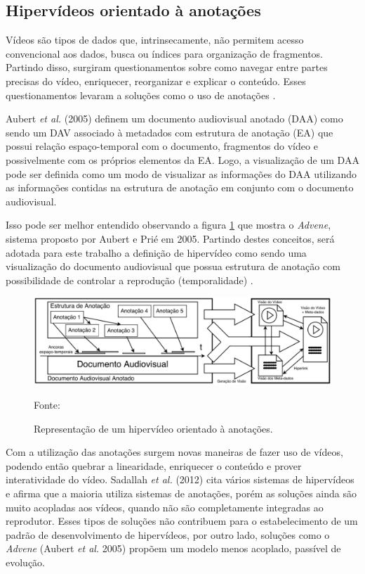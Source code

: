 \subsection{Hipervídeos orientado à anotações}

Vídeos são tipos de dados que, intrinsecamente, não permitem acesso convencional aos dados, busca ou índices para organização de fragmentos. Partindo disso, surgiram questionamentos sobre como navegar entre partes precisas do vídeo, enriquecer, reorganizar e explicar o conteúdo. Esses questionamentos levaram a soluções como o uso de anotações \cite{sadallah2012}.

Aubert \textit{et al.} (2005) definem um documento audiovisual anotado (DAA) como sendo um DAV associado à metadados com estrutura de anotação (EA) que possui relação espaço-temporal com o documento, fragmentos do vídeo e possivelmente com os próprios elementos da EA. Logo, a visualização de um DAA pode ser definida como um modo de visualizar as informações do DAA utilizando as informações contidas na estrutura de anotação em conjunto com o documento audiovisual.

Isso pode ser melhor entendido observando a figura \ref{fig:diagram_DAVOA} que mostra o \textit{Advene}, sistema proposto por Aubert e Prié em 2005. Partindo destes conceitos, será adotada para este trabalho a definição de hipervídeo como sendo uma visualização do documento audiovisual que possua estrutura de anotação com possibilidade de controlar a reprodução (temporalidade) \cite{aubert2005}.

\begin{figure}[h!]
	\centering
  	\includegraphics[width=.9\linewidth]{figuras/diagram_DAVOA.eps}
  	\caption{Representação de um hipervídeo orientado à anotações.}
  	\small{Fonte: \cite{sadallah2012}}
  	\label{fig:diagram_DAVOA}
\end{figure}

Com a utilização das anotações surgem novas maneiras de fazer uso de vídeos, podendo então quebrar a linearidade, enriquecer o conteúdo e prover interatividade do vídeo. Sadallah \textit{et al.} (2012) cita vários sistemas de hipervídeos e afirma que a maioria utiliza sistemas de anotações, porém as soluções ainda são muito acopladas aos vídeos, quando não são completamente integradas ao reprodutor. Esses tipos de soluções não contribuem para o estabelecimento de um padrão de desenvolvimento de hipervídeos, por outro lado, soluções como o \textit{Advene} (Aubert \textit{et al.} 2005) propõem um modelo menos acoplado, passível de evolução.


